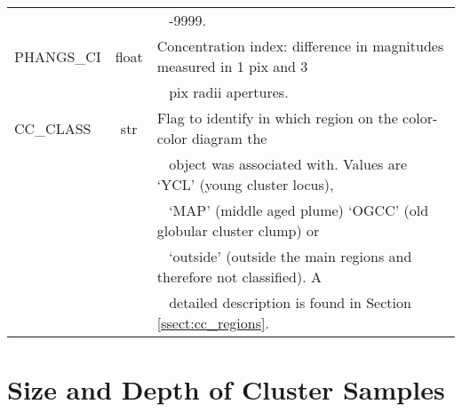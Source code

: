 \documentclass[linenumbers]{aastex63}
\begin{document}
\begin{table*}
\begin{tabular}{lcl}
 &  &  \,\,\, -9999. \\ 
PHANGS\_CI & float & Concentration index: difference in magnitudes measured in 1 pix and 3 \\ 
 &  &  \,\,\, pix radii apertures. \\ 
CC\_CLASS & str & Flag to identify in which region on the color-color diagram the \\ 
 &  &  \,\,\, object was associated with. Values are `YCL' (young cluster locus), \\ 
 &  &  \,\,\, `MAP' (middle aged plume) `OGCC' (old globular cluster clump) or \\ 
 &  &  \,\,\, `outside' (outside the main regions and therefore not classified). A \\ 
 &  &  \,\,\, detailed description is found in Section\,\ref{ssect:cc_regions}. \\ 
\hline
\end{tabular} 
\end{table*}
% 




\section{Size and Depth of Cluster Samples}\label{sect:catalog_properties}
\end{document}
